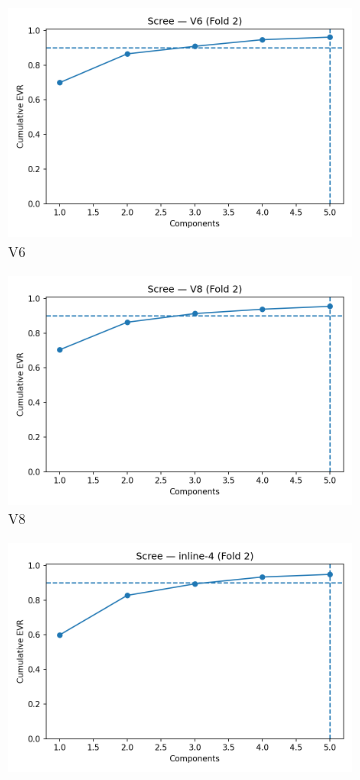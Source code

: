 \documentclass[11pt]{article}
\begin{document}
\begin{figure}[!htbp]
\centering
\begin{subfigure}{0.19\linewidth}
  \includegraphics[width=\linewidth]{rep_scree_V6.png}
  \caption{V6}
\end{subfigure}\hfill
\begin{subfigure}{0.19\linewidth}
  \includegraphics[width=\linewidth]{rep_scree_V8.png}
  \caption{V8}
\end{subfigure}\hfill
\begin{subfigure}{0.19\linewidth}
  \includegraphics[width=\linewidth]{rep_scree_inline-4.png}

\end{subfigure}
\end{figure}
\end{document}
